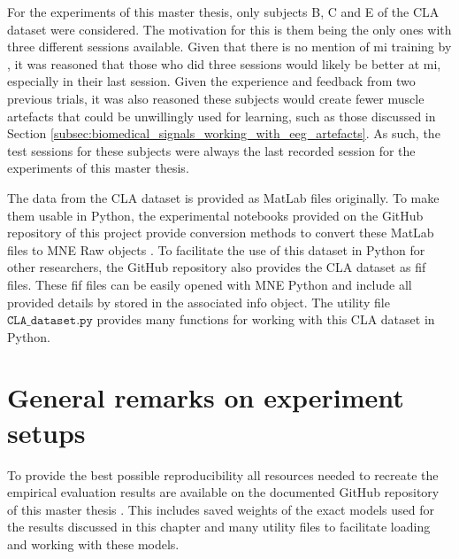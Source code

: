 For the experiments of this master thesis, only subjects B, C and E of the CLA dataset were considered.
The motivation for this is them being the only ones with three different sessions available.
Given that there is no mention of \gls{mi} training by \citet{eeg_data}, it was reasoned that those who did three sessions would likely be better at \gls{mi}, especially in their last session.
Given the experience and feedback from two previous trials, it was also reasoned these subjects would create fewer muscle artefacts that could be unwillingly used for learning, such as those discussed in Section \ref{subsec:biomedical_signals_working_with_eeg_artefacts}.
As such, the test sessions for these subjects were always the last recorded session for the experiments of this master thesis.

The data from the CLA dataset is provided as MatLab files originally.
To make them usable in Python, the experimental notebooks provided on the GitHub repository of this project provide conversion methods to convert these MatLab files to MNE Raw objects \citep{github_project, mne}.
To facilitate the use of this dataset in Python for other researchers, the GitHub repository also provides the CLA dataset as \gls{fif} files.
These \gls{fif} files can be easily opened with MNE Python and include all provided details by \citet{eeg_data} stored in the associated info object.
The utility file $\texttt{CLA\_dataset.py}$ provides many functions for working with this CLA dataset in Python.

\section{General remarks on experiment setups}
\label{sec:evaluation_general_remarks}

To provide the best possible reproducibility all resources needed to recreate the empirical evaluation results are available on the documented GitHub repository of this master thesis \citep{github_project}.
This includes saved weights of the exact models used for the results discussed in this chapter and many utility files to facilitate loading and working with these models.

